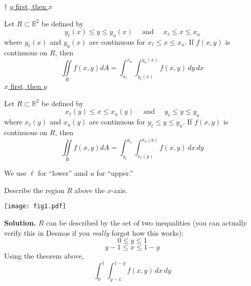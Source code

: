 \begin{Theorem}{$ \dagger $}{}
    \underline{$ y $ first, then $ x $}

    Let $ R\subset \mathbb{R}^2 $ be defined by
    \[ y_\ell(x)\le y\le y_u(x)\quad\text{ and }\quad
        x_{\ell}\le x\le x_u \]
    where $ y_{\ell}(x) $ and $ y_u(x) $ are continuous
    for $ x_{\ell}\le x\le x_u $. If $ f(x,y) $
    is continuous on $ R $, then
    \[ \iint\limits_{R}f(x,y)dA=
        \int_{x_\ell}^{x_u} \int_{y_\ell(x)}^{y_u(x)} f(x,y)\, d{y} \, d{x}  \]
    \underline{$ x $ first, then $ y $}

    Let $ R\subset \mathbb{R}^2 $ be defined by
    \[ x_\ell(y)\le x\le x_u(y)\quad\text{ and }\quad
        y_{\ell}\le y\le y_u \]
    where $ x_{\ell}(y) $ and $ x_u(y) $ are continuous
    for $ y_{\ell}\le y\le y_u $. If $ f(x,y) $
    is continuous on $ R $, then
    \[ \iint\limits_{R}f(x,y)dA=
        \int_{y_\ell}^{y_u} \int_{x_\ell(y)}^{x_u(y)} f(x,y)\, d{x} \, d{y}  \]
\end{Theorem}
We use $ \ell $ for ``lower'' amd $ u $ for ``upper.''
\begin{Example}{}{}
    Describe the region $ R $ above the $ x $-axis.
    \begin{center}
        \texttt{[image: fig1.pdf]}
    \end{center}
    \textbf{Solution.} $ R $ can be described by the set of two inequalities
    (you can actually verify this in Desmos if you \emph{really} forgot how this works):
    \[ 0\le y\le 1 \]
    \[ y-1\le x\le 1-y \]
    Using the theorem above,
    \[ \int_{0}^{1} \int_{y-1}^{1-y} f(x,y)\, d{x}\, d{y}  \]
\end{Example}
